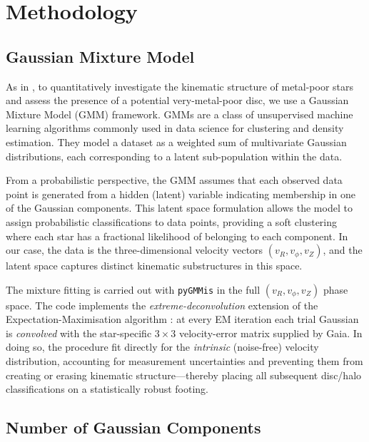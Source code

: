 \documentclass[a4paper,12pt]{article}
\begin{document}
\section{Methodology}

\subsection{Gaussian Mixture Model}

As in \citet{zhang2024existencemetalpoordiscmilky}, to quantitatively investigate the kinematic structure of metal-poor stars and assess 
the presence of a potential very-metal-poor disc, we use a Gaussian Mixture Model (GMM) framework. 
GMMs are a class of unsupervised machine learning algorithms commonly used in data science 
for clustering and density estimation. They model a dataset as a weighted sum of multivariate 
Gaussian distributions, each corresponding to a latent sub-population within the data.

From a probabilistic perspective, the GMM assumes that each observed data point is generated from a 
hidden (latent) variable indicating membership in one of the Gaussian components. This latent space 
formulation allows the model to assign probabilistic classifications to data points, providing a 
soft clustering where each star has a fractional likelihood of belonging to each component. In our case, 
the data is the three-dimensional velocity vectors $(v_R, v_\phi, v_Z)$, and the latent space captures 
distinct kinematic substructures in this space.

The mixture fitting is carried out with \texttt{pyGMMis} \citep{pygmmis} in the full $(v_R,v_\phi,v_Z)$ 
phase space. The code implements the \emph{extreme-deconvolution} extension of the Expectation-Maximisation 
algorithm \citep{Bovy2011}: at every EM iteration each trial Gaussian is \emph{convolved} with the star-specific 
$3{\times}3$ velocity-error matrix supplied by Gaia. In doing so, the procedure fit directly for the 
\textit{intrinsic} (noise-free) velocity distribution, accounting for measurement uncertainties and 
preventing them from creating or erasing kinematic structure—thereby placing all subsequent disc/halo 
classifications on a statistically robust footing.


\subsection{Number of Gaussian Components}
\label{subsec:n_components}
\end{document}
